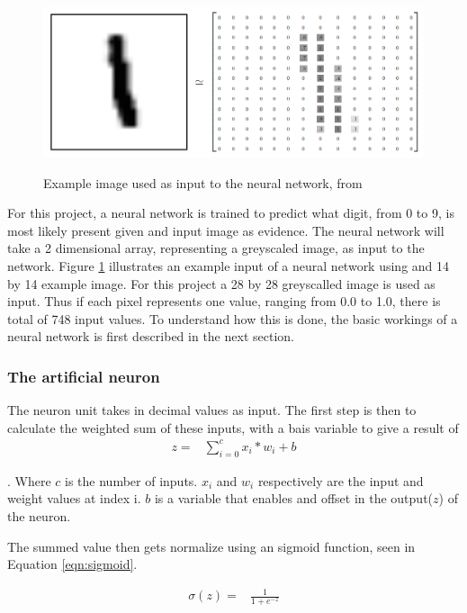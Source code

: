 \begin{figure}
  \centering
  \includegraphics[width=14cm]{MNIST}\\
  \caption{Example image used as input to the neural network, from \citet{tensor2017}}
  \label{fig:mnist}
\end{figure}

For this project, a neural network is trained to predict what digit, from 0 to 9, is most likely present given and input image as evidence. The neural network will take a 2 dimensional array, representing a greyscaled image, as input to the network. Figure \ref{fig:mnist} illustrates an example input of a neural network using and 14 by 14 example image. For this project a 28 by 28 greyscalled image is used as input. Thus if each pixel represents one value, ranging from 0.0 to 1.0, there is total of 748 input values. To understand how this is done, the basic workings of a neural network is first described in the next section.

\subsubsection{The artificial neuron}

The neuron unit takes in decimal values as input. The first step is then to calculate the weighted sum of these inputs, with a bais variable to give a result of 
\begin{align}
  z =  &\displaystyle{\sum_{i=0}^{c} x_{i}*w_{i} + b}
\label{eqn:nnOut}
\end{align}

.  Where $c$ is the number of inputs. $x_{i}$ and $w_{i}$ respectively are the input and weight values at index i. $b$ is a variable that enables and offset in the output($z$) of the neuron.


The summed value then gets normalize using an sigmoid function, seen in Equation \ref{eqn:sigmoid}.

\begin{align}
  \sigma(z) =  &\displaystyle{\frac{1}{1 + e^{-z}}}
\label{eqn:sigmoid}
\end{align}

